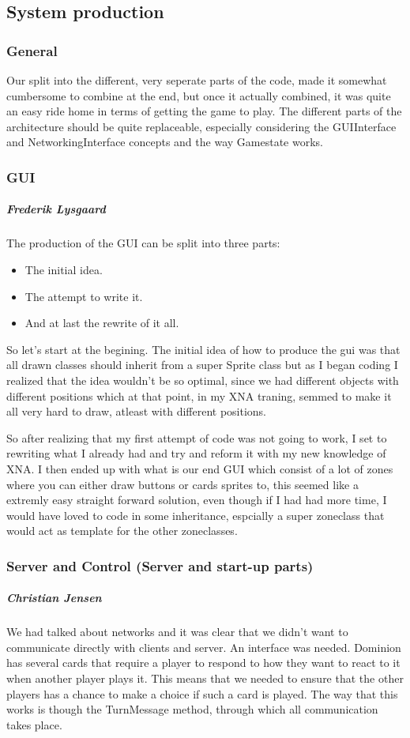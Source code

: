 \subsection{System production}
\subsubsection{General}
Our split into the different, very seperate parts of the code, made it somewhat cumbersome to combine at the end, but once it actually combined, it was quite an easy ride home in terms of getting the game to play. The different parts of the architecture should be quite replaceable, especially considering the GUIInterface and NetworkingInterface concepts and the way Gamestate works.
\subsubsection{GUI}
\subparagraph{Frederik Lysgaard}
The production of the GUI can be split into three parts:
\begin{itemize}
\item The initial idea.
\item The attempt to write it.
\item  And at last the rewrite of it all.
\end{itemize}
So let's start at the begining. The initial idea of how to produce the gui was that all drawn classes should inherit from a super Sprite class but as I began coding I realized that the idea wouldn't be so optimal, since we had different objects with different positions which at that point, in my XNA traning, semmed to make it all very hard to draw, atleast with different positions.

So after realizing that my first attempt of code was not going to work, I set to rewriting what I already had and try and reform it with my new knowledge of XNA.
I then ended up with what is our end GUI which consist of a lot of zones where you can either draw buttons or cards sprites to, this seemed like a extremly easy straight forward solution, even though if I had had more time, I would have loved to code in some inheritance, espcially a super zoneclass that would act as template for the other zoneclasses.

\subsubsection{Server and Control (Server and start-up parts)}
\subparagraph{Christian Jensen}
We had talked about networks and it was clear that we didn't want to communicate directly with clients and server. An interface was needed.
Dominion has several cards that require a player to respond to how they want to react to it when another player plays it. 
This means that we needed to ensure that the other players has a chance to make a choice if such a card is played. 
The way that this works is though the TurnMessage method, through which all communication takes place. 

